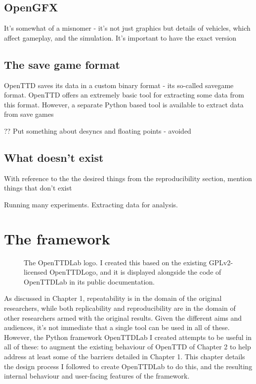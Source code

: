 \documentclass[logo,msc,dsti]{infthesis}    %
\begin{document}
\section{OpenGFX}

It's somewhat of a misnomer - it's not just graphics but details of vehicles, which affect gameplay, and the simulation. It's important to have the exact version

\section{The save game format}

OpenTTD saves its data in a custom binary format - its so-called savegame format. OpenTTD offers an extremely basic tool for extracting some data from this format. However, a separate Python based tool is available to extract data from save games

?? Put something about desyncs and floating points - avoided

\section{What doesn't exist}

\begin{itemize}
\begin{item}
With reference to the the desired things from the reproducibility section, mention things that don't exist
\end{item}
\end{itemize}

Running many experiments. Extracting data for analysis.

\chapter{The framework}

\begin{figure}[h]
\centering

\caption{The OpenTTDLab logo. I created this based on the existing GPLv2-licensed OpenTTDLogo, and it is displayed alongside the code of OpenTTDLab in its public documentation.}
\label{fig:openttlab-logo}
\end{figure}

As discussed in Chapter 1, repeatability is in the domain of the original researchers, while both replicability and reproducibility are in the domain of other researchers armed with the original results. Given the different aims and audiences, it's not immediate that a single tool can be used in all of these. However, the Python framework OpenTTDLab I created attempts to be useful in all of these: to augment the existing behaviour of OpenTTD of Chapter 2 to help address at least some of the barriers detailed in Chapter 1. This chapter details the design process I followed to create OpenTTDLab to do this, and the resulting internal behaviour and user-facing features of the framework.
\end{document}
